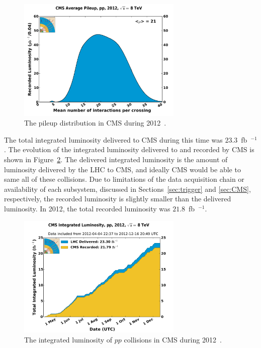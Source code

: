\begin{figure}[htbp!]
 \begin{center}
    \includegraphics[width=0.70\textwidth]{figures/experiment/pileup_pp_2012.pdf}
      \end{center}
\caption{The pileup distribution in CMS during 2012~\cite{CMS:lumi}.}
\label{fig:pileup2012}
\end{figure}

The total integrated luminosity delivered to CMS during this time was $23.3$~fb~$^{-1}$.
The evolution of the integrated luminosity delivered to and recorded by CMS is shown in
Figure~\ref{fig:integratedlumi2012}. The delivered integrated luminosity is the amount of
luminosity delivered by the LHC to CMS, and ideally CMS would be able to same all of these collisions.
Due to limitations of the data acquisition chain or availability of each subsystem, discussed in
Sections~\ref{sec:trigger} and \ref{sec:CMS}, respectively, the recorded luminosity
is slightly smaller than the delivered luminosity.
In 2012, the total recorded luminosity was $21.8$~fb~$^{-1}$.

\begin{figure}[htbp!]
 \begin{center}
    \includegraphics[width=0.70\textwidth]{figures/experiment/int_lumi_per_day_cumulative_pp_2012.pdf}
      \end{center}
\caption{The integrated luminosity of $pp$ collisions in CMS during 2012~\cite{CMS:lumi}.}
\label{fig:integratedlumi2012}
\end{figure}

